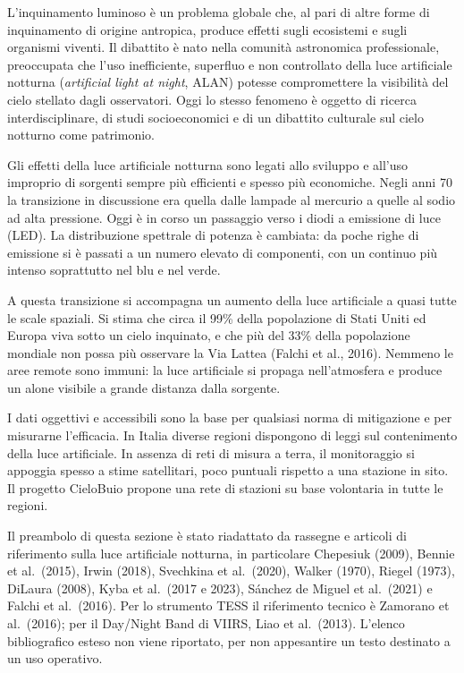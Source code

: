 \documentclass[11pt,a4paper]{report}
\begin{document}
L'inquinamento luminoso è un problema globale che, al pari di altre forme di inquinamento di origine antropica, produce effetti sugli ecosistemi e sugli organismi viventi. Il dibattito è nato nella comunità astronomica professionale, preoccupata che l'uso inefficiente, superfluo e non controllato della luce artificiale notturna (\textit{artificial light at night}, ALAN) potesse compromettere la visibilità del cielo stellato dagli osservatori. Oggi lo stesso fenomeno è oggetto di ricerca interdisciplinare, di studi socioeconomici e di un dibattito culturale sul cielo notturno come patrimonio.

Gli effetti della luce artificiale notturna sono legati allo sviluppo e all'uso improprio di sorgenti sempre più efficienti e spesso più economiche. Negli anni 70 la transizione in discussione era quella dalle lampade al mercurio a quelle al sodio ad alta pressione. Oggi è in corso un passaggio verso i diodi a emissione di luce (LED). La distribuzione spettrale di potenza è cambiata: da poche righe di emissione si è passati a un numero elevato di componenti, con un continuo più intenso soprattutto nel blu e nel verde.

A questa transizione si accompagna un aumento della luce artificiale a quasi tutte le scale spaziali. Si stima che circa il 99\% della popolazione di Stati Uniti ed Europa viva sotto un cielo inquinato, e che più del 33\% della popolazione mondiale non possa più osservare la Via Lattea (Falchi et al., 2016). Nemmeno le aree remote sono immuni: la luce artificiale si propaga nell'atmosfera e produce un alone visibile a grande distanza dalla sorgente.

I dati oggettivi e accessibili sono la base per qualsiasi norma di mitigazione e per misurarne l'efficacia. In Italia diverse regioni dispongono di leggi sul contenimento della luce artificiale. In assenza di reti di misura a terra, il monitoraggio si appoggia spesso a stime satellitari, poco puntuali rispetto a una stazione in sito. Il progetto CieloBuio propone una rete di stazioni su base volontaria in tutte le regioni.

Il preambolo di questa sezione è stato riadattato da rassegne e articoli di riferimento sulla luce artificiale notturna, in particolare Chepesiuk (2009), Bennie et al.\ (2015), Irwin (2018), Svechkina et al.\ (2020), Walker (1970), Riegel (1973), DiLaura (2008), Kyba et al.\ (2017 e 2023), Sánchez de Miguel et al.\ (2021) e Falchi et al.\ (2016). Per lo strumento TESS il riferimento tecnico è Zamorano et al.\ (2016); per il Day/Night Band di VIIRS, Liao et al.\ (2013). L'elenco bibliografico esteso non viene riportato, per non appesantire un testo destinato a un uso operativo.
\end{document}
